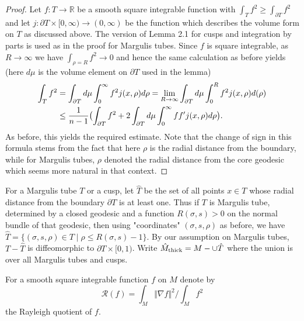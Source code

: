 \documentclass[11pt]{amsart}
\theoremstyle{plain}
\theoremstyle{plain}
\theoremstyle{definition}
\newcommand{\cal}{\mathcal}
\begin{document}
\begin{proof}
Let 
$f:T\to \mathbb{R}$ be a smooth square integrable function with 
$\int_Tf^2\geq \int_{\partial T}f^2$ and let 
$j:\partial T\times [0,\infty)\to 
(0,\infty)$ be the function which describes the volume form on $T$
as discussed above. The version of 
Lemma 2.1 for cusps and integration by parts is used as in the proof for
Margulis tubes.
Since $f$ is square integrable,
as $R\to \infty$ we have $\int_{\rho=R}f^2\to 0$ and hence
the same calculation as before yields 
(here $d\mu$ is the 
volume element on $\partial T$
 used in the lemma) 
\begin{align} \int_Tf^2 &=\int_{\partial T}d\mu
\int_{0}^\infty f^2 j(x,\rho)d\rho
=\lim_{R\to\infty}
\int_{\partial T}d\mu\int_{0}^R f^2j(x,\rho)d(\rho)\notag \\
&\leq \frac{1}{n-1}\bigl(
\int_{\partial T}f^2+2\int_{\partial T}d\mu
\int_0^\infty ff^\prime j(x,\rho) d\rho \bigr).\notag
\end{align}  
As before,   
this yields the required estimate. 
Note that the change of sign in this formula stems from the fact that
here $\rho$ is the radial distance from the boundary, while for Margulis
tubes, $\rho$ denoted the radial distance from the core geodesic which 
seems more natural in that context. 
\end{proof}


 

For a Margulis tube $T$ or a cusp, let $\hat T$ be the set of all points 
$x \in T$ whose radial distance from the boundary $\partial T$ is at least one. 
Thus if $T$ is Margulis tube, determined by a closed
geodesic and a function $R(\sigma,s)>0$ on the normal bundle of that geodesic, then 
using "coordinates" $(\sigma,s,\rho)$ as before,  
we have  $\hat T=\{(\sigma,s,\rho)\in T\mid \rho\leq R(\sigma,s)-1\}$. 
By our assumption on Margulis tubes,
$T-\hat T$ is diffeomorphic to $\partial T\times [0,1)$.
Write $\hat M_{\rm thick}=M-\cup \hat T$ where the union is over all 
Margulis tubes and cusps. 


For a smooth square integrable function $f$ on $M$ denote by
\[{\cal R}(f)=\int_M \Vert \nabla f\Vert^2/\int_M f^2\]
the Rayleigh quotient of $f$. 
\end{document}
